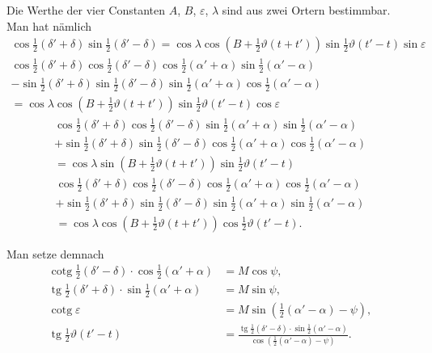 \documentclass[12pt,a4paper]{article}
\theoremstyle{plain}
\theoremstyle{definition}
\theoremstyle{remark}
\DeclareMathOperator{\tg}{tg}
\DeclareMathOperator{\cotg}{cotg}
\begin{document}
Die Werthe der vier Constanten $A$, $B$, $\varepsilon$, $\lambda$ sind aus zwei Ortern bestimmbar. Man hat n\"amlich
\begin{multline*}
\cos\tfrac{1}{2}(\delta' + \delta) \sin\tfrac{1}{2}(\delta' - \delta) = \cos\lambda \cos(B + \tfrac{1}{2}\vartheta(t + t')) \sin\tfrac{1}{2}\vartheta(t' - t) \sin\varepsilon \\
\cos\tfrac{1}{2}(\delta' + \delta) \cos\tfrac{1}{2}(\delta' - \delta) \cos\tfrac{1}{2}(\alpha' + \alpha) \sin\tfrac{1}{2}(\alpha' - \alpha) \\
- \sin\tfrac{1}{2}(\delta' + \delta) \sin\tfrac{1}{2}(\delta' - \delta) \sin\tfrac{1}{2}(\alpha' + \alpha) \cos\tfrac{1}{2}(\alpha' - \alpha) \\
= \cos\lambda \cos(B + \tfrac{1}{2}\vartheta(t + t')) \sin\tfrac{1}{2}\vartheta(t' - t) \cos\varepsilon
\end{multline*}
\begin{multline*}
\cos\tfrac{1}{2}(\delta' + \delta) \cos\tfrac{1}{2}(\delta' - \delta) \sin\tfrac{1}{2}(\alpha' + \alpha) \sin\tfrac{1}{2}(\alpha' - \alpha) \\
+ \sin\tfrac{1}{2}(\delta' + \delta) \sin\tfrac{1}{2}(\delta' - \delta) \cos\tfrac{1}{2}(\alpha' + \alpha) \cos\tfrac{1}{2}(\alpha' - \alpha) \\
= \cos\lambda \sin(B + \tfrac{1}{2}\vartheta(t + t')) \sin\tfrac{1}{2}\vartheta(t' - t)
\end{multline*}
\begin{multline*}
\cos\tfrac{1}{2}(\delta' + \delta) \cos\tfrac{1}{2}(\delta' - \delta) \cos\tfrac{1}{2}(\alpha' + \alpha) \cos\tfrac{1}{2}(\alpha' - \alpha) \\
+ \sin\tfrac{1}{2}(\delta' + \delta) \sin\tfrac{1}{2}(\delta' - \delta) \sin\tfrac{1}{2}(\alpha' + \alpha) \sin\tfrac{1}{2}(\alpha' - \alpha) \\
= \cos\lambda \cos(B + \tfrac{1}{2}\vartheta(t + t')) \cos\tfrac{1}{2}\vartheta(t' - t).
\end{multline*}

Man setze demnach
\begin{align*}
\cotg\tfrac{1}{2}(\delta' - \delta) \cdot \cos\tfrac{1}{2}(\alpha' + \alpha) &= M\cos\psi, \\
\tg\tfrac{1}{2}(\delta' + \delta) \cdot \sin\tfrac{1}{2}(\alpha' + \alpha) &= M\sin\psi, \\
\cotg\varepsilon &= M\sin(\tfrac{1}{2}(\alpha' - \alpha) - \psi), \\
\tg\tfrac{1}{2}\vartheta(t' - t) &= \tfrac{\tg\tfrac{1}{2}(\delta' - \delta) \cdot \sin\tfrac{1}{2}(\alpha' - \alpha)}{\cos(\tfrac{1}{2}(\alpha' - \alpha) - \psi)}.
\end{align*}
\end{document}
